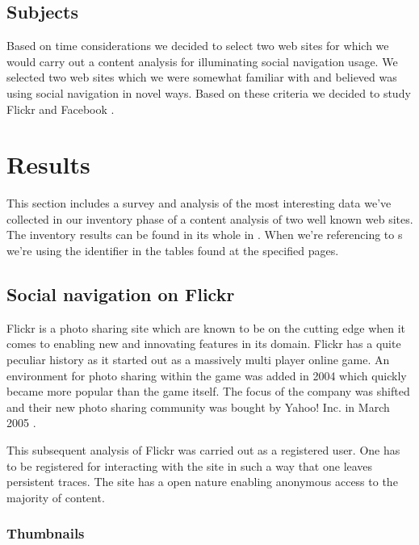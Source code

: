 \subsection{Subjects}

Based on time considerations we decided to select two web sites for which
we would carry out a content analysis for illuminating social navigation
usage. We selected two web sites which we were somewhat familiar with and
believed was using social navigation in novel ways. Based on these criteria
we decided to study Flickr%
and Facebook%
.

\section{Results}

This section includes a survey and analysis of the most interesting
data we've collected in our inventory phase of a content analysis
of two well known web sites. The inventory results can be found in its whole
in . When we're referencing to s we're
using the identifier in the tables found at the specified pages.

\subsection{Social navigation on Flickr}
\label{section:analysis.flickr}

Flickr is a photo sharing site which are known to be on the cutting edge when
it comes to enabling new and innovating features in its domain. Flickr has a
quite peculiar history as it started out as a massively multi player online
game. An environment for photo sharing within the game was added in 2004 which
quickly became more popular than the game itself. The focus of the company was
shifted and their new photo sharing community was bought by Yahoo! Inc. in
March 2005 \citep[]{livingston07}.

This subsequent
analysis of Flickr was carried out as a registered user. One has to be
registered for interacting with the site in such a way that one leaves
persistent traces. The site has a open nature enabling anonymous access
to the majority of content.

\subsubsection{Thumbnails}


